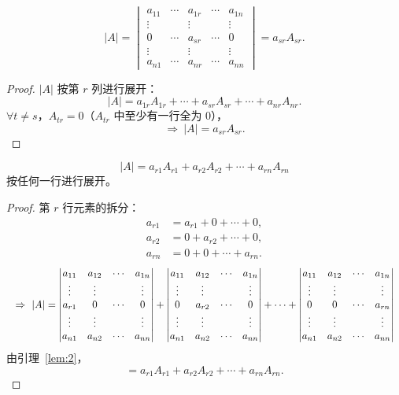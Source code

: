 \begin{lemma}\label{lem:2}%
\[
|A|=\begin{vmatrix}
a_{11} & \cdots & a_{1r} & \cdots & a_{1n}\\
\vdots & & \vdots & & \vdots\\
0 & \cdots & a_{sr} & \cdots & 0\\
\vdots & & \vdots & & \vdots\\
a_{n1} & \cdots & a_{nr} & \cdots & a_{nn}
\end{vmatrix}
=a_{sr}A_{sr}.
\]
\end{lemma}

\begin{proof}
$|A|$ 按第 $r$ 列进行展开：
\[
|A|=a_{1r}A_{1r}+\cdots+a_{sr}A_{sr}+\cdots+a_{nr}A_{nr}.
\]
$\forall t\neq s$，$A_{tr}=0$（$A_{tr}$ 中至少有一行全为 $0$），
\[
\Rightarrow\ |A|=a_{sr}A_{sr}.
\]
\end{proof}

\begin{lemma}%
\[
|A|=a_{r1}A_{r1}+a_{r2}A_{r2}+\cdots+a_{rn}A_{rn}
\]
按任何一行进行展开。
\end{lemma}

\begin{proof}
第 $r$ 行元素的拆分：
\[
\begin{aligned}
a_{r1}&=a_{r1}+0+\cdots+0,\\
a_{r2}&=0+a_{r2}+\cdots+0,\\
a_{rn}&=0+0+\cdots+a_{rn}.
\end{aligned}
\]
\[
\resizebox{\linewidth}{!}{$\displaystyle
\Rightarrow\ |A|=
\begin{vmatrix}
a_{11} & a_{12} & \cdots & a_{1n}\\
\vdots & \vdots & & \vdots\\
a_{r1} & 0 & \cdots & 0\\
\vdots & \vdots & & \vdots\\
a_{n1} & a_{n2} & \cdots & a_{nn}
\end{vmatrix}
+
\begin{vmatrix}
a_{11} & a_{12} & \cdots & a_{1n}\\
\vdots & \vdots & & \vdots\\
0 & a_{r2} & \cdots & 0\\
\vdots & \vdots & & \vdots\\
a_{n1} & a_{n2} & \cdots & a_{nn}
\end{vmatrix}
+\cdots+
\begin{vmatrix}
a_{11} & a_{12} & \cdots & a_{1n}\\
\vdots & \vdots & & \vdots\\
0 & 0 & \cdots & a_{rn}\\
\vdots & \vdots & & \vdots\\
a_{n1} & a_{n2} & \cdots & a_{nn}
\end{vmatrix}$}
\]
由引理~\ref{lem:2}，
\[
=a_{r1}A_{r1}+a_{r2}A_{r2}+\cdots+a_{rn}A_{rn}.
\]
\end{proof}

